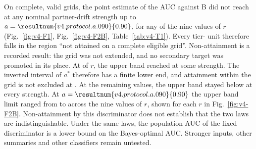 On complete, valid grids, the point estimate of the AUC against B did not reach  at any nominal partner-drift strength up to $a=\resultnum{v4.protocol.a.090}{0.90}$, for any of the nine values of $r$ (Fig.~\ref{fig:v4-F1}, Fig.~\ref{fig:v4-F2B}, Table~\ref{tab:v4-T1}). %
Every tier- unit therefore falls in the region ``not attained on a complete eligible grid''. %
Non-attainment is a recorded result: the grid was not extended, and no secondary target was promoted in its place. %
At   of $r$, the upper band reached  at some strength. The inverted interval of $a^*$ therefore has a finite lower end, and attainment within the grid is not excluded at . At the remaining values, the upper band stayed below  at every strength. %
At $a=\resultnum{v4.protocol.a.090}{0.90}$ the upper band limit ranged from  to  across the nine values of $r$, shown for each $r$ in Fig.~\ref{fig:v4-F2B}. %
Non-attainment by this discriminator does not establish that the two laws are indistinguishable. Under the same laws, the population AUC of the fixed discriminator is a lower bound on the Bayes-optimal AUC. Stronger inputs, other summaries and other classifiers remain untested. %


